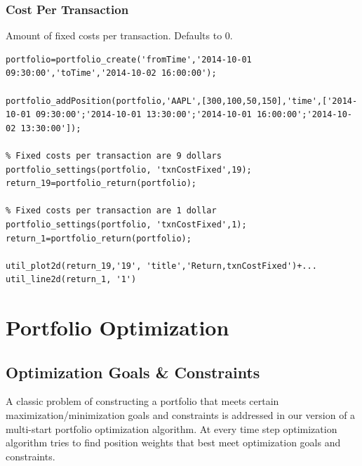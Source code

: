 \documentclass[letterpaper]{report}
\begin{document}
\subsection {Cost Per Transaction}
Amount of fixed costs per transaction. Defaults to 0.
\begin{lstlisting}
portfolio=portfolio_create('fromTime','2014-10-01 09:30:00','toTime','2014-10-02 16:00:00');

portfolio_addPosition(portfolio,'AAPL',[300,100,50,150],'time',['2014-10-01 09:30:00';'2014-10-01 13:30:00';'2014-10-01 16:00:00';'2014-10-02 13:30:00']);

% Fixed costs per transaction are 9 dollars
portfolio_settings(portfolio, 'txnCostFixed',19);
return_19=portfolio_return(portfolio);

% Fixed costs per transaction are 1 dollar
portfolio_settings(portfolio, 'txnCostFixed',1);
return_1=portfolio_return(portfolio);

util_plot2d(return_19,'19', 'title','Return,txnCostFixed')+...
util_line2d(return_1, '1')
\end{lstlisting}

\chapter{Portfolio Optimization}

\section{Optimization Goals \& Constraints}
A classic problem of constructing a portfolio that meets certain maximization/minimization 
goals and constraints is addressed in our version of a multi-start portfolio optimization algorithm. At every time step
optimization algorithm tries to find position weights that best meet optimization goals and constraints.
\end{document}
